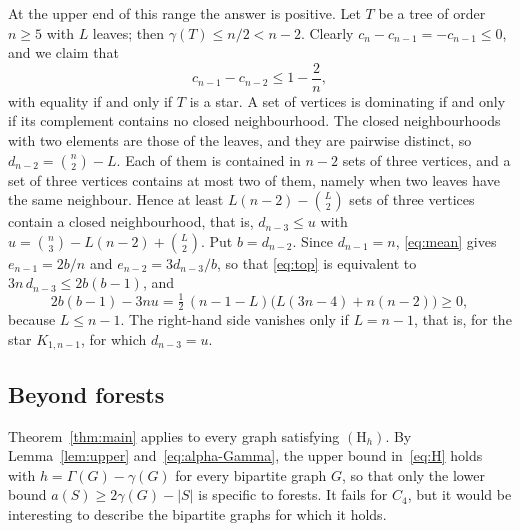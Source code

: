 At the upper end of this range the answer is positive. Let $T$ be a tree of
order $n\ge5$ with $L$ leaves; then $\gamma(T)\le n/2<n-2$. Clearly
$c_n-c_{n-1}=-c_{n-1}\le0$, and we claim that
\begin{equation}\label{eq:top}
  c_{n-1}-c_{n-2}\le1-\frac2n ,
\end{equation}
with equality if and only if $T$ is a star. A set of vertices is dominating if
and only if its complement contains no closed neighbourhood. The closed
neighbourhoods with two elements are those of the leaves, and they are
pairwise distinct, so $d_{n-2}=\binom n2-L$. Each of them is contained in
$n-2$ sets of three vertices, and a set of three vertices contains at most
two of them, namely when two leaves have the same neighbour. Hence at least
$L(n-2)-\binom L2$ sets of three vertices contain a closed neighbourhood, that
is, $d_{n-3}\le u$ with $u=\binom n3-L(n-2)+\binom L2$. Put $b=d_{n-2}$. Since
$d_{n-1}=n$, \eqref{eq:mean} gives $e_{n-1}=2b/n$ and $e_{n-2}=3d_{n-3}/b$, so
that \eqref{eq:top} is equivalent to $3n\,d_{n-3}\le2b(b-1)$, and
\[
  2b(b-1)-3nu=\tfrac12\,(n-1-L)\bigl(L(3n-4)+n(n-2)\bigr)\ge0 ,
\]
because $L\le n-1$. The right-hand side vanishes only if $L=n-1$, that is,
for the star $K_{1,n-1}$, for which $d_{n-3}=u$.

\subsection*{Beyond forests}
Theorem~\ref{thm:main} applies to every graph satisfying
$(\mathrm{H}_h)$. By Lemma~\ref{lem:upper} and~\eqref{eq:alpha-Gamma}, the upper
bound in~\eqref{eq:H} holds with $h=\Gamma(G)-\gamma(G)$ for every bipartite
graph $G$, so that only the lower bound $a(S)\ge2\gamma(G)-|S|$ is specific to
forests. It fails for $C_4$, but it would be interesting to describe the
bipartite graphs for which it holds.

